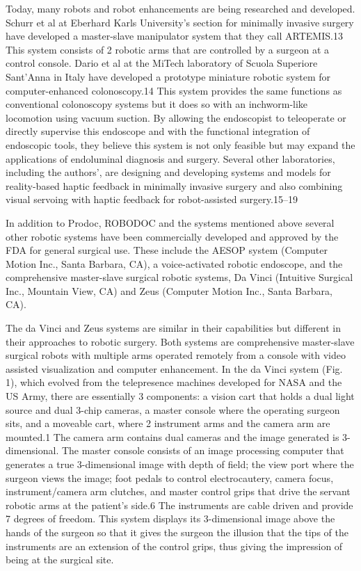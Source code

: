 \cite{lanfranco_robotic_2004} Today, many robots and robot enhancements are being researched and developed. Schurr et al at Eberhard Karls University’s section for minimally invasive surgery have developed a master-slave manipulator system that they call ARTEMIS.13 This system consists of 2 robotic arms that are controlled by a surgeon at a control console. Dario et al at the MiTech laboratory of Scuola Superiore Sant’Anna in Italy have developed a prototype miniature robotic system for computer-enhanced colonoscopy.14 This system provides the same functions as conventional colonoscopy systems but it does so with an inchworm-like locomotion using vacuum suction. By allowing the endoscopist to teleoperate or directly supervise this endoscope and with the functional integration of endoscopic tools, they believe this system is not only feasible but may expand the applications of endoluminal diagnosis and surgery. Several other laboratories, including the authors’, are designing and developing systems and models for reality-based haptic feedback in minimally invasive surgery and also combining visual servoing with haptic feedback for robot-assisted surgery.15–19

In addition to Prodoc, ROBODOC and the systems mentioned above several other robotic systems have been commercially developed and approved by the FDA for general surgical use. These include the AESOP system (Computer Motion Inc., Santa Barbara, CA), a voice-activated robotic endoscope, and the comprehensive master-slave surgical robotic systems, Da Vinci (Intuitive Surgical Inc., Mountain View, CA) and Zeus (Computer Motion Inc., Santa Barbara, CA).

The da Vinci and Zeus systems are similar in their capabilities but different in their approaches to robotic surgery. Both systems are comprehensive master-slave surgical robots with multiple arms operated remotely from a console with video assisted visualization and computer enhancement. In the da Vinci system (Fig. 1), which evolved from the telepresence machines developed for NASA and the US Army, there are essentially 3 components: a vision cart that holds a dual light source and dual 3-chip cameras, a master console where the operating surgeon sits, and a moveable cart, where 2 instrument arms and the camera arm are mounted.1 The camera arm contains dual cameras and the image generated is 3-dimensional. The master console consists of an image processing computer that generates a true 3-dimensional image with depth of field; the view port where the surgeon views the image; foot pedals to control electrocautery, camera focus, instrument/camera arm clutches, and master control grips that drive the servant robotic arms at the patient’s side.6 The instruments are cable driven and provide 7 degrees of freedom. This system displays its 3-dimensional image above the hands of the surgeon so that it gives the surgeon the illusion that the tips of the instruments are an extension of the control grips, thus giving the impression of being at the surgical site.

